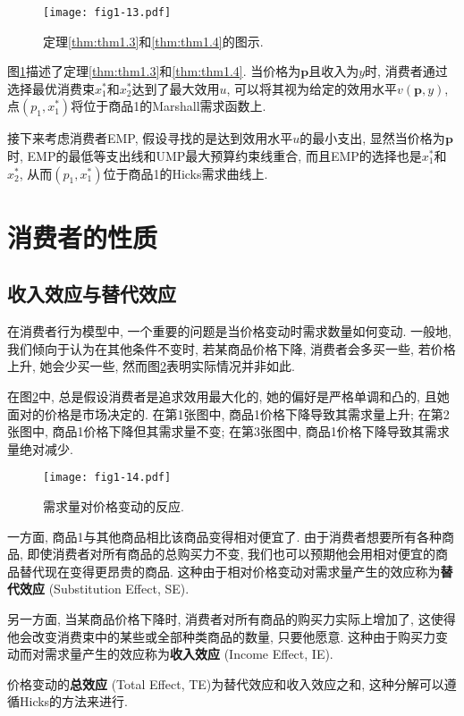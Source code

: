 \documentclass[cn, 12pt, math=mtpro2, bibstyle=apa, blue]{elegantbook}
\newcommand{\p}{\mathbf{p}}
\begin{document}
\begin{figure}[htbp!]
  \centering
  \texttt{[image: fig1-13.pdf]}
  \caption{定理\ref{thm:thm1.3}和\ref{thm:thm1.4}的图示.}\label{fig1.13}
\end{figure}

图\ref{fig1.13}描述了定理\ref{thm:thm1.3}和\ref{thm:thm1.4}. 当价格为$\p$且收入为$y$时, 消费者通过选择最优消费束$x_1^\ast$和$x_2^\ast$达到了最大效用$u$, 可以将其视为给定的效用水平$v(\p,y)$, 点$(p_1,x^\ast_1)$将位于商品1的Marshall需求函数上.

接下来考虑消费者EMP, 假设寻找的是达到效用水平$u$的最小支出, 显然当价格为$\p$时, EMP的最低等支出线和UMP最大预算约束线重合, 而且EMP的选择也是$x_1^\ast$和$x_2^\ast$, 从而$(p_1,x_1^\ast)$位于商品1的Hicks需求曲线上.


\section{消费者的性质}
\subsection{收入效应与替代效应}
在消费者行为模型中, 一个重要的问题是当价格变动时需求数量如何变动. 一般地, 我们倾向于认为在其他条件不变时, 若某商品价格下降, 消费者会多买一些, 若价格上升, 她会少买一些, 然而图\ref{fig1.14}表明实际情况并非如此.

在图\ref{fig1.14}中, 总是假设消费者是追求效用最大化的, 她的偏好是严格单调和凸的, 且她面对的价格是市场决定的. 在第1张图中, 商品1价格下降导致其需求量上升; 在第2张图中, 商品1价格下降但其需求量不变; 在第3张图中, 商品1价格下降导致其需求量绝对减少.
\begin{figure}[htbp!]
  \centering
  \texttt{[image: fig1-14.pdf]}
  \caption{需求量对价格变动的反应.}\label{fig1.14}
\end{figure}

一方面, 商品1与其他商品相比该商品变得相对便宜了. 由于消费者想要所有各种商品, 即使消费者对所有商品的总购买力不变, 我们也可以预期他会用相对便宜的商品替代现在变得更昂贵的商品. 这种由于相对价格变动对需求量产生的效应称为\textbf{替代效应} (Substitution Effect, SE).

另一方面, 当某商品价格下降时, 消费者对所有商品的购买力实际上增加了, 这使得他会改变消费束中的某些或全部种类商品的数量, 只要他愿意. 这种由于购买力变动而对需求量产生的效应称为\textbf{收入效应} (Income Effect, IE).

价格变动的\textbf{总效应} (Total Effect, TE)为替代效应和收入效应之和, 这种分解可以遵循Hicks的方法来进行.
\end{document}
